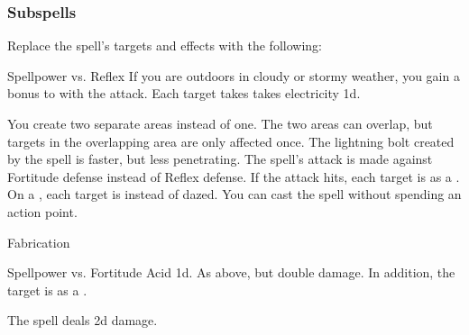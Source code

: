 \subsubsection{Subspells}
Replace the spell's targets and effects with the following:
\begin{spellcontent}
\begin{augmenttargetinginfo}
\end{augmenttargetinginfo}
\begin{augmenteffects}
\begin{spellattack}{Spellpower vs. Reflex}
\spellspecial
If you are outdoors in cloudy or stormy weather, you gain a  bonus to  with the attack.
\spellsuccess
Each target takes takes electricity  \plus1d.
\end{spellattack}
\end{augmenteffects}
\end{spellcontent}
You create two separate areas instead of one.
The two areas can overlap, but targets in the overlapping area are only affected once.
The lightning bolt created by the spell is faster, but less penetrating.
The spell's attack is made against Fortitude defense instead of Reflex defense.
If the attack hits, each target is  as a .
On a , each target is  instead of dazed.
You can cast the spell without spending an action point.
\begin{spellsection}{Fabrication}
\begin{spellheader}
\end{spellheader}
\begin{spellcontent}
\begin{spelltargetinginfo}
\end{spelltargetinginfo}
\begin{spelleffects}
\begin{spellattack}{Spellpower vs. Fortitude}
\spellsuccess
Acid  \plus1d.
\spellcritical
As above, but double damage.
In addition, the target is  as a .
\end{spellattack}
\end{spelleffects}
\end{spellcontent}
\begin{spellfooter}
\end{spellfooter}
\begin{spellsubcontent}
\begin{spellcantrip}
The spell deals \minus2d damage.
\end{spellcantrip}
\end{spellsubcontent}
\end{spellsection}
